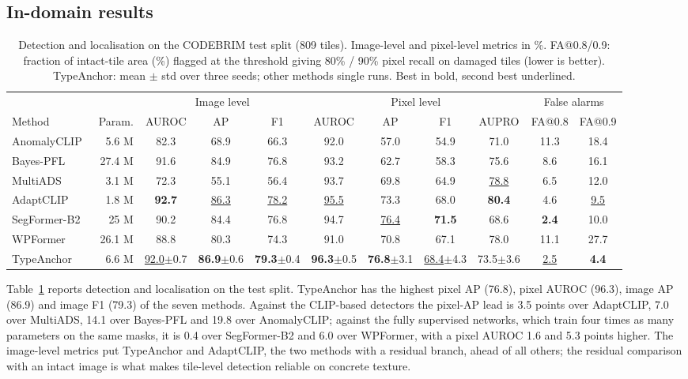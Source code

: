 \documentclass[conference]{IEEEtran}
\newcommand{\best}[1]{\textbf{#1}}
\newcommand{\second}[1]{\underline{#1}}
\newcommand{\ours}{TypeAnchor}
\begin{document}
\subsection{In-domain results}
\begin{table}[t]
\centering
\caption{Detection and localisation on the CODEBRIM test split (809 tiles). Image-level and pixel-level metrics in \%. FA@0.8/0.9: fraction of intact-tile area (\%) flagged at the threshold giving 80\% / 90\% pixel recall on damaged tiles (lower is better). \ours{}: mean $\pm$ std over three seeds; other methods single runs. Best in bold, second best underlined.}
\label{tab:binary}
\small
\setlength{\tabcolsep}{5pt}
\begin{tabular}{lrccccccccc}
\toprule
& & \multicolumn{3}{c}{Image level} & \multicolumn{4}{c}{Pixel level} & \multicolumn{2}{c}{False alarms} \\
\cmidrule(lr){3-5}\cmidrule(lr){6-9}\cmidrule(lr){10-11}
Method & Param. & AUROC & AP & F1 & AUROC & AP & F1 & AUPRO & FA@0.8 & FA@0.9 \\
\midrule
AnomalyCLIP~\cite{anomalyclip} & 5.6 M & 82.3 & 68.9 & 66.3 & 92.0 & 57.0 & 54.9 & 71.0 & 11.3 & 18.4 \\
Bayes-PFL~\cite{bayespfl} & 27.4 M & 91.6 & 84.9 & 76.8 & 93.2 & 62.7 & 58.3 & 75.6 & 8.6 & 16.1 \\
MultiADS~\cite{multiads} & 3.1 M & 72.3 & 55.1 & 56.4 & 93.7 & 69.8 & 64.9 & \second{78.8} & 6.5 & 12.0 \\
AdaptCLIP~\cite{adaptclip} & 1.8 M & \best{92.7} & \second{86.3} & \second{78.2} & \second{95.5} & 73.3 & 68.0 & \best{80.4} & 4.6 & \second{9.5} \\
SegFormer-B2~\cite{segformer} & 25 M & 90.2 & 84.4 & 76.8 & 94.7 & \second{76.4} & \best{71.5} & 68.6 & \best{2.4} & 10.0 \\
WPFormer~\cite{wpformer} & 26.1 M & 88.8 & 80.3 & 74.3 & 91.0 & 70.8 & 67.1 & 78.0 & 11.1 & 27.7 \\
\ours{} & 6.6 M & \second{92.0}$\pm$0.7 & \best{86.9}$\pm$0.6 & \best{79.3}$\pm$0.4 & \best{96.3}$\pm$0.5 & \best{76.8}$\pm$3.1 & \second{68.4}$\pm$4.3 & 73.5$\pm$3.6 & \second{2.5} & \best{4.4} \\
\bottomrule
\end{tabular}
\end{table}

Table~\ref{tab:binary} reports detection and localisation on the test split. \ours{} has the highest pixel AP (76.8), pixel AUROC (96.3), image AP (86.9) and image F1 (79.3) of the seven methods. Against the CLIP-based detectors the pixel-AP lead is 3.5 points over AdaptCLIP, 7.0 over MultiADS, 14.1 over Bayes-PFL and 19.8 over AnomalyCLIP; against the fully supervised networks, which train four times as many parameters on the same masks, it is 0.4 over SegFormer-B2 and 6.0 over WPFormer, with a pixel AUROC 1.6 and 5.3 points higher. The image-level metrics put \ours{} and AdaptCLIP, the two methods with a residual branch, ahead of all others; the residual comparison with an intact image is what makes tile-level detection reliable on concrete texture.
\end{document}
